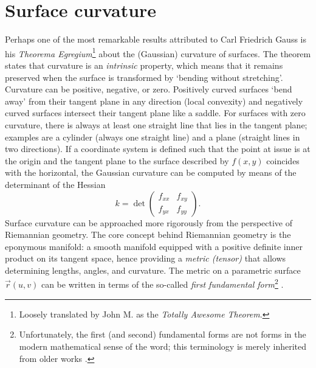 \section{Surface curvature}
\label{sec:curvature}
Perhaps one of the most remarkable results attributed to Carl Friedrich Gauss is his \emph{Theorema Egregium}\footnote{Loosely translated by John M. \citet{Lee1997} as the \emph{Totally Awesome Theorem}.} about the (Gaussian) curvature of surfaces. The theorem states that curvature is an \emph{intrinsic} property, which means that it remains preserved when the surface is transformed by `bending without stretching'. Curvature can be positive, negative, or zero. Positively curved surfaces `bend away' from their tangent plane in any direction (local convexity) and negatively curved surfaces intersect their tangent plane like a saddle. For surfaces with zero curvature, there is always at least one straight line that lies in the tangent plane; examples are a cylinder (always one straight line) and a plane (straight lines in two directions). If a coordinate system is defined such that the point at issue is at the origin and the tangent plane to the surface described by \(f(x, y)\) coincides with the horizontal, the Gaussian curvature can be computed by means of the determinant of the Hessian \cite{Thurston1997, ONeill2006}
\[ 
    k = \det 
    \begin{pmatrix}
            f_{xx} & f_{xy}\\
            f_{yx} & f_{yy}
    \end{pmatrix}.
\]
    Surface curvature can be approached more rigorously from the perspective of Riemannian geometry. The core concept behind Riemannian geometry is the eponymous manifold: a smooth manifold equipped with a positive definite inner product%
    on its tangent space, hence providing a \emph{metric (tensor)} that allows determining lengths, angles, and curvature. The metric on a parametric surface \(\vec{r}(u, v)\) can be written in terms of the so-called \emph{first fundamental form}\footnote{Unfortunately, the first (and second) fundamental forms are not forms in the modern mathematical sense of the word; this terminology is merely inherited from older works \cite{Spivak1999b}.} . 
    
